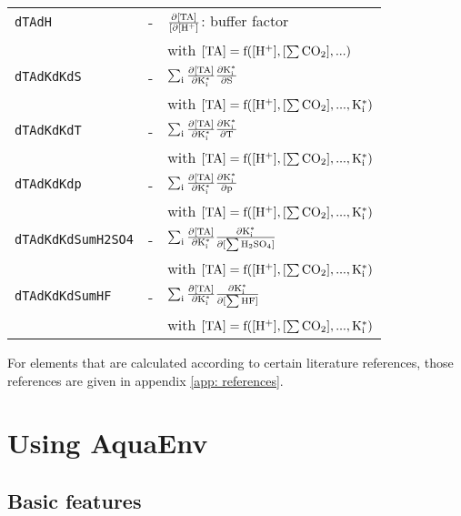 \documentclass[article,nojss]{jss}
\newcommand{\aq}{\textbf{\textsf{AquaEnv}}}
\begin{document}
\begin{footnotesize}
\begin{longtable}{l|l|p{7cm}}
\texttt{dTAdH}       & -                               & $\rm \frac{\partial [TA]}{[\partial [H^+]}$: buffer factor\\
            &                                 & with $\rm [TA] = f([H^+], [\sum CO_2], ...)$\\        
\texttt{dTAdKdKdS}   & -                               & $\rm \sum_i \frac{\partial [TA]}{\partial K^*_i} \frac{\partial K^*_i}{\partial S}$\\
            &                                 &  with $\rm [TA] = f([H^+], [\sum CO_2], ..., K^*_i)$\\        
\texttt{dTAdKdKdT}   & -                               & $\rm \sum_i \frac{\partial [TA]}{\partial K^*_i} \frac{\partial K^*_i}{\partial T}$\\
            &                                 & with $\rm [TA] = f([H^+], [\sum CO_2], ..., K^*_i)$\\     
\texttt{dTAdKdKdp}   & -                               & $\rm \sum_i \frac{\partial [TA]}{\partial K^*_i} \frac{\partial K^*_i}{\partial p}$\\
            &                                 &  with $\rm [TA] = f([H^+], [\sum CO_2], ..., K^*_i)$\\ 
\texttt{dTAdKdKdSumH2SO4} & -                          & $\rm \sum_i \frac{\partial [TA]}{\partial K^*_i} \frac{\partial K^*_i}{\partial [\sum H_2SO_4]}$\\
            &                                 & with $\rm [TA] = f([H^+], [\sum CO_2], ..., K^*_i)$\\ 
\texttt{dTAdKdKdSumHF} & -                             & $\rm \sum_i \frac{\partial [TA]}{\partial K^*_i} \frac{\partial K^*_i}{\partial [\sum HF]}$\\
            &                                 & with $\rm [TA] = f([H^+], [\sum CO_2], ..., K^*_i)$\\    \hline
\end{longtable}
\end{footnotesize}

For elements that are calculated according to certain literature references, those references are given in appendix \ref{app: references}.

\section{Using \aq}

\subsection{Basic features}
\end{document}
